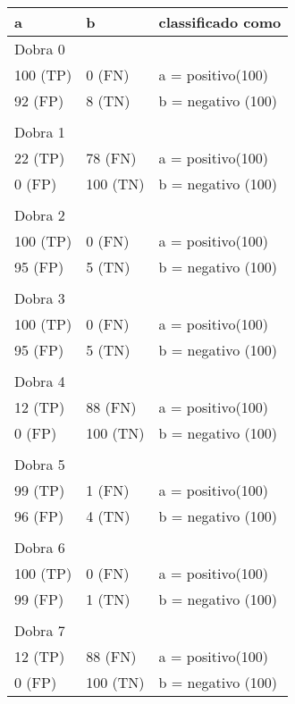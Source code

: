 \begin{table}[!h]
    \begin{tabular}{lll}
    a         					& b                          		& classificado como                                  \\ \hline
	Dobra 0 \\    
    100 (TP)    				&0 (FN)      				& a = positivo(100) \\
    92 (FP)    				&8 (TN)      				& b = negativo (100) \\
	&&\\
	Dobra 1    \\
    22 (TP)    				&78 (FN)      				& a = positivo(100) \\
    0 (FP)    				&100 (TN)      			& b = negativo (100) \\   
	&&\\ 
	Dobra 2    \\
    100 (TP)    				&0 (FN)      				& a = positivo(100) \\
    95 (FP)    				&5 (TN)      				& b = negativo (100) \\   
	&&\\
    Dobra 3    \\
    100 (TP)    				&0 (FN)      				& a = positivo(100) \\
    95 (FP)    				&5 (TN)      				& b = negativo (100) \\   
	&&\\
	Dobra 4    \\
    12 (TP)    				&88 (FN)      				& a = positivo(100) \\ 
    0 (FP)    				&100 (TN)      				& b = negativo (100) \\
	&&\\
	Dobra 5    \\
    99 (TP)    				&1 (FN)      				& a = positivo(100) \\ 
    96 (FP)    				&4 (TN)      				& b = negativo (100) \\
	&&\\
	Dobra 6    \\
    100 (TP)    				&0 (FN)      				& a = positivo(100) \\ 
    99 (FP)    				&1 (TN)      			& b = negativo (100) \\
	&&\\
	Dobra 7    \\
    12 (TP)    				&88 (FN)      				& a = positivo(100) \\ 
    0 (FP)    				&100 (TN)      				& b = negativo (100) \\

\end{tabular}
\end{table}
